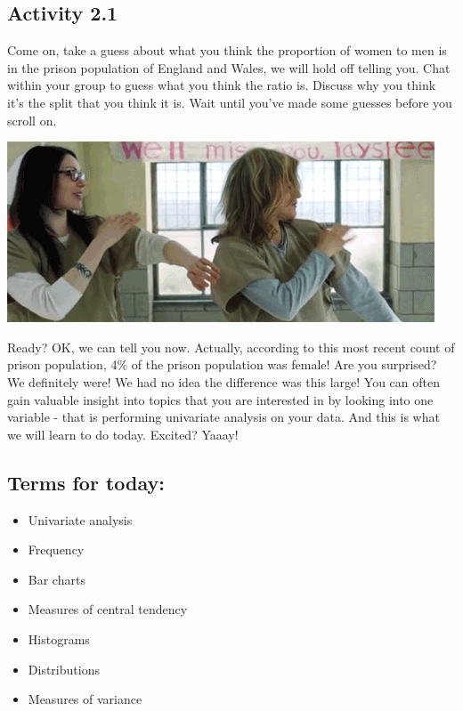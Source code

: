 \documentclass[
]{book}
\providecommand{\tightlist}{%
  \setlength{\itemsep}{0pt}\setlength{\parskip}{0pt}}
\begin{document}
\hypertarget{activity-2.1}{%
\subsection{Activity 2.1}\label{activity-2.1}}

Come on, take a guess about what you think the proportion of women to men is in the prison population of England and Wales, we will hold off telling you. Chat within your group to guess what you think the ratio is. Discuss why you think it's the split that you think it is. Wait until you've made some guesses before you scroll on.

\includegraphics{imgs/oitnb_dance.gif}

Ready? OK, we can tell you now. Actually, according to this most recent count of prison population, 4\% of the prison population was female! Are you surprised? We definitely were! We had no idea the difference was this large! You can often gain valuable insight into topics that you are interested in by looking into one variable - that is performing univariate analysis on your data. And this is what we will learn to do today. Excited? Yaaay!

\hypertarget{terms-for-today}{%
\subsection{Terms for today:}\label{terms-for-today}}

\begin{itemize}
\tightlist
\item
  Univariate analysis
\item
  Frequency
\item
  Bar charts
\item
  Measures of central tendency
\item
  Histograms
\item
  Distributions
\item
  Measures of variance
\end{itemize}
\end{document}
